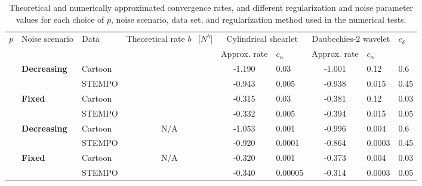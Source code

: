 \documentclass[11pt,a4paper]{article}
\numberwithin{equation}{section}
\newcommand{\bigger}[1]{\scalebox{1.2}{#1}} %
\begin{document}
\begin{table}[bt]
\footnotesize
  \caption{\noindent Theoretical and numerically approximated convergence rates, and different regularization and noise parameter values for each choice of $p$, noise scenario, data set, and regularization method used in the numerical tests.}  \label{tab:table}
\begin{center}
  \begin{tabular}{cllc@{\extracolsep{4pt}}clcll@{}} 
    \multirow{2}{*}{$p$} & \multirow{2}{3.5em}{Noise scenario} & \multirow{2}{*}{Data} & \multirow{2}{5em}{Theoretical rate $b$ \ [$N^b$]} & \multicolumn{2}{c}{Cylindrical shearlet} & \multicolumn{2}{c}{Daubechies-2 wavelet} & \multirow{2}{*}{$c_\delta$} \\ \cline{5-6}\cline{7-8}
       &   &   &   & Approx. rate & $c_\alpha$ & Approx. rate & $c_\alpha$ & \rule[-6pt]{0pt}{0pt}\\ \hline \hline %
    \multirow{4}{*}{\bigger{$\frac{3}{2}$}} & \multirow{2}{*}{\textbf{Decreasing}} & Cartoon & \multirow{2}{*}{\bigger{$-1$}} & -1.190 & 0.03 & -1.001 & 0.12 & 0.6 \rule{0pt}{10pt} \\[0.2em] %
       &   & STEMPO &  & -0.943 & 0.005 & -0.938 & 0.015 & 0.45 \\[.5em] %
       & \multirow{2}{*}{\textbf{Fixed}} & Cartoon & \multirow{2}{*}{\bigger{$-\frac{1}{3}$}} & -0.315 & 0.03 & -0.381 & 0.12 & 0.03 \\[0.2em] %
       &    & STEMPO &   & -0.332 & 0.005 & -0.394 & 0.015 & 0.05 \\[1em] %
    \multirow{4}{*}{\bigger{$1$}} & \multirow{2}{*}{\textbf{Decreasing}} & Cartoon & \multirow{2}{*}{N/A} & -1.053 & 0.001 & -0.996 & 0.004 & 0.6 \\[0.2em] %
       &   & STEMPO &  & -0.920 & 0.0001 & -0.864 & 0.0003 & 0.45 \\[.5em] %
       & \multirow{2}{*}{\textbf{Fixed}} & Cartoon & \multirow{2}{*}{N/A} & -0.320 & 0.001 & -0.373 & 0.004 & 0.03 \\[0.2em] %
       &    & STEMPO &   & -0.340 & 0.00005 & -0.314 & 0.0003 & 0.05 \\ %
  \end{tabular}
\end{center}
\end{table}
\end{document}
